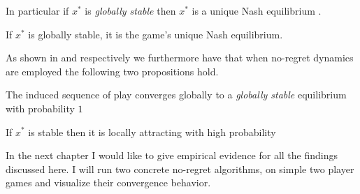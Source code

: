 In particular if $x^*$ is \textit{globally stable} then $x^*$ is a unique Nash equilibrium \cite[Prop.2.5]{mertikopoulos}.

\begin{proposition}\label{prop:GloballyStableUniqueNE}
    If $x^*$ is globally stable, it is the game’s unique Nash equilibrium.
\end{proposition}

As shown in \cite[Theorem 4.7]{mertikopoulos} and \cite[Theorem 4.11]{mertikopoulos} respectively we furthermore have that when no-regret dynamics are employed the following two propositions hold.

\begin{proposition}\label{prop:globalConvergence}
    The induced sequence of play converges globally to a \textit{globally stable} equilibrium with probability $1$
\end{proposition}

\begin{proposition}\label{prop:localConvergence}
    If $x^*$ is stable then it is locally attracting with high probability
\end{proposition}


In the next chapter I would like to give empirical evidence for all the findings discussed here. I will run two concrete no-regret algorithms, on simple two player games and visualize their convergence behavior. 
